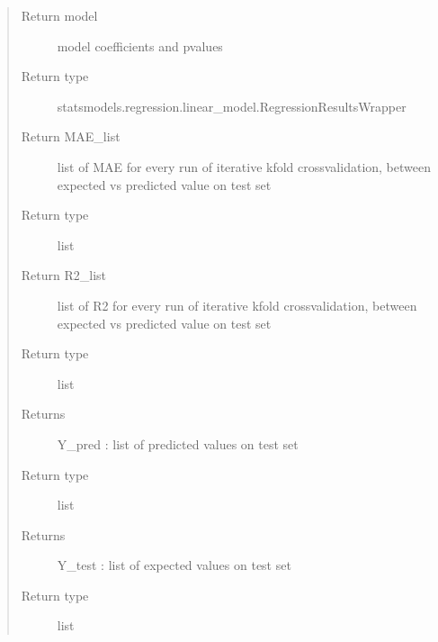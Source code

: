 \documentclass[letterpaper,10pt,english]{sphinxmanual}
\begin{document}
\begin{fulllineitems}
\begin{quote}
\begin{description}
\begin{itemize}
\end{itemize}

\item[{Return model}] \leavevmode
\sphinxAtStartPar
model coefficients and p\sphinxhyphen{}values

\item[{Return type}] \leavevmode
\sphinxAtStartPar
statsmodels.regression.linear\_model.RegressionResultsWrapper

\item[{Return MAE\_list}] \leavevmode
\sphinxAtStartPar
list of MAE for every run of iterative k\sphinxhyphen{}fold crossvalidation, between expected vs predicted value on test set

\item[{Return type}] \leavevmode
\sphinxAtStartPar
list

\item[{Return R2\_list}] \leavevmode
\sphinxAtStartPar
list of R2 for every run of iterative k\sphinxhyphen{}fold crossvalidation, between expected vs predicted value on test set

\item[{Return type}] \leavevmode
\sphinxAtStartPar
list

\item[{Returns}] \leavevmode
\sphinxAtStartPar
Y\_pred : list of predicted values on test set

\item[{Return type}] \leavevmode
\sphinxAtStartPar
list

\item[{Returns}] \leavevmode
\sphinxAtStartPar
Y\_test : list of expected values on test set

\item[{Return type}] \leavevmode
\sphinxAtStartPar
list

\end{description}\end{quote}

\end{fulllineitems}

\end{document}

